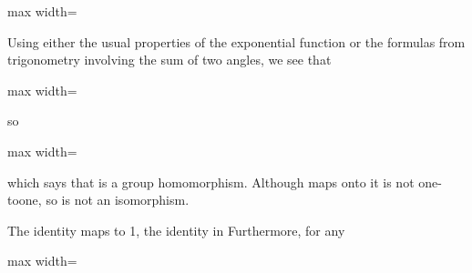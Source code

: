 \documentclass[11pt,oneside]{article}
\begin{document}
\begin{BookBody}
\begin{center}\begin{adjustbox}{max width=\linewidth}\end{adjustbox}\end{center}

\noindent Using either the usual properties of the exponential function or the formulas from trigonometry involving the sum of two angles, we see that

\begin{center}\begin{adjustbox}{max width=\linewidth}\end{adjustbox}\end{center}

\noindent so

\begin{center}\begin{adjustbox}{max width=\linewidth}\end{adjustbox}\end{center}

\noindent which says that \BookInline{\phi } is a group homomorphism. Although \BookInline{\phi } maps onto  it is not one-toone, so \BookInline{\phi } is not an isomorphism.

The identity  maps to 1, the identity in  Furthermore, for any 

\begin{center}\begin{adjustbox}{max width=\linewidth}\end{adjustbox}\end{center} \BookEnd{\blacktriangle}

\end{BookBody}

\BookNarrativetrue
\end{document}
